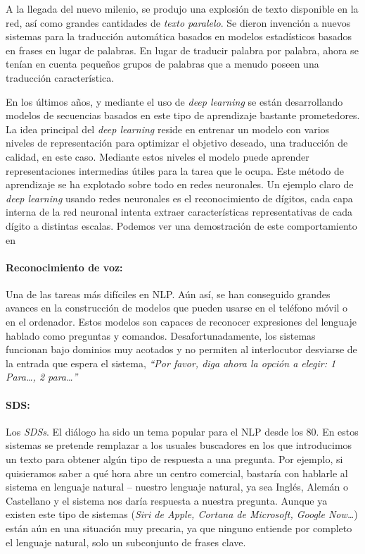A la llegada del nuevo milenio, se produjo una explosión de texto disponible en
la red, así como grandes cantidades de \emph{texto paralelo}. Se dieron
invención a nuevos sistemas para la traducción automática basados en modelos
estadísticos basados en frases en lugar de palabras. En lugar de traducir
palabra por palabra, ahora se tenían en cuenta pequeños grupos de palabras que a
menudo poseen una traducción característica.

En los últimos años, y mediante el uso de \emph{deep learning} se están
desarrollando modelos de secuencias basados en este tipo de aprendizaje bastante
prometedores. La idea principal del \emph{deep learning} reside en entrenar un
modelo con varios niveles de representación para optimizar el objetivo deseado,
una traducción de calidad, en este caso. Mediante estos niveles el modelo puede
aprender representaciones intermedias útiles para la tarea que le ocupa. Este
método de aprendizaje se ha explotado sobre todo en redes neuronales. Un ejemplo
claro de \emph{deep learning} usando redes neuronales es el reconocimiento de
dígitos, cada capa interna de la red neuronal intenta extraer características
representativas de cada dígito a distintas escalas. Podemos ver una demostración
de este comportamiento en \citet{computerPhile:nn}

\paragraph{Reconocimiento de voz:} Una de las tareas más difíciles en
\ac{NLP}. Aún así, se han conseguido grandes avances en la construcción de
modelos que pueden usarse en el teléfono móvil o en el ordenador. Estos modelos
son capaces de reconocer expresiones del lenguaje hablado como preguntas y
comandos. Desafortunadamente, los sistemas
 funcionan bajo dominios muy acotados
y no permiten al interlocutor desviarse de la entrada que espera el sistema, \eg
\emph{``Por favor, diga ahora la opción a elegir: 1 Para\dots, 2 para\dots''}

\paragraph{SDS:} Los \emph{\acp{SDS}}. El diálogo ha sido un tema popular para el \ac{NLP} desde los
80. En estos sistemas se pretende remplazar a los usuales buscadores en los que
introducimos un texto para obtener algún tipo de respuesta a una pregunta. Por
ejemplo, si quisieramos saber a qué hora abre un centro comercial, bastaría con
hablarle al sistema en lenguaje natural -- nuestro lenguaje natural, ya sea
Inglés, Alemán o Castellano y el sistema nos daría respuesta a nuestra
pregunta. Aunque ya existen este tipo de sistemas (\eg \emph{Siri de Apple,
  Cortana de Microsoft, Google Now\dots}) están aún en una situación muy
precaria, ya que ninguno entiende por completo el lenguaje natural, solo un
subconjunto de frases clave.

